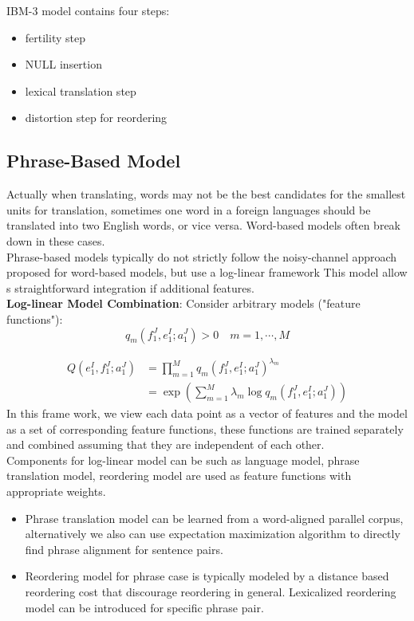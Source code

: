 IBM-3 model contains four steps: 
\begin{itemize}
	\item fertility step
	\item NULL insertion
	\item lexical translation step
	\item distortion step for reordering
\end{itemize}

\subsection{Phrase-Based Model}
Actually when translating, words may not be the best candidates for the smallest units for translation, sometimes one word in a foreign languages should be translated into two English words, or vice versa. Word-based models often break down in these cases.\\
Phrase-based models typically do not strictly follow the noisy-channel approach proposed for word-based models, but use a log-linear framework This model allow s straightforward integration if additional features.\\

\textbf{Log-linear Model Combination}:
Consider arbitrary models ("feature functions"):
\[ q_m(f_1^J, e_1^I; a_1^J) > 0  \quad m = 1, \cdots, M\]

\begin{align*}
	Q(e_1^I, f_1^J; a_1^J) & = \prod_{m=1}^{M} q_m(f_1^J, e_1^I; a_1^J)^{\lambda_m} \\
	& = \exp(\sum_{m=1}^{M} \lambda_m \log q_m(f_1^J, e_1^I; a_1^J))
\end{align*}
In this frame work, we view each data point as a vector of features and the model as a set of corresponding feature functions, these functions are trained separately and combined assuming that they are independent of each other.\\ 

Components for log-linear model can be such as language model, phrase translation model, reordering model are used as feature functions with appropriate weights.
\begin{itemize}
	\item Phrase translation model can be learned from a word-aligned parallel corpus, alternatively we also can use expectation maximization algorithm to directly find phrase alignment for sentence pairs.
	\item Reordering model for phrase case is typically modeled by a distance based reordering cost that discourage reordering in general. Lexicalized reordering model can be introduced for specific phrase pair.
\end{itemize}

